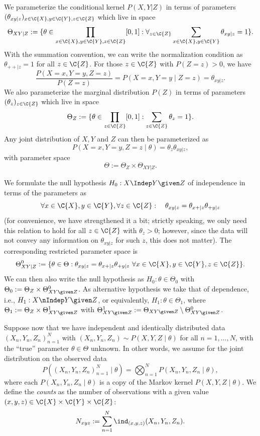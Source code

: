 We parameterize the conditional kernel $P(X,Y | Z)$ in terms of parameters
$(\theta_{xy|z})_{x\in\C{X},y\in\C{Y},z\in\C{Z}}$ which live in space
$$\Theta_{XY|Z} := %
\{ \theta \in \prod_{x\in\C{X},y\in\C{Y},z\in\C{Z}} [0,1] : \forall_{z\in\C{Z}} \sum_{x\in\C{X},y\in\C{Y}} \theta_{xy|z} = 1\}.$$
With the summation convention, we can write the normalization condition as $\theta_{++|z} = 1$ for all $z \in \C{Z}$.
For those $z\in\C{Z}$ with $P(Z = z) > 0$, we have 
$$\frac{P(X = x, Y = y, Z = z)}{P(Z=z)} = P(X = x, Y = y \mid Z=z) = \theta_{xy|z}.$$
We also parameterize the marginal distribution $P(Z)$ in terms of parameters
$(\theta_z)_{z\in\C{Z}}$ which live in space
$$\Theta_Z := \{ \theta \in \prod_{z\in\C{Z}} [0,1] : \sum_{z\in\C{Z}} \theta_z = 1\}.$$
Any joint distribution of $X,Y$ and $Z$ can then be parameterized as
$$P(X=x,Y=y,Z=z \mid \theta) = \theta_z \theta_{xy|z},$$
with parameter space
$$\Theta := \Theta_Z\times \Theta_{XY|Z}.$$

We formulate the null hypothesis $H_0 : X \Indep Y \given Z$ of independence
in terms of the parameters as
$$\forall x \in \C{X}, y \in \C{Y}, \forall z \in \C{Z}: \quad \theta_{xy|z} = \theta_{x+|z} \theta_{+ y|z}$$
(for convenience, we have strengthened it a bit; strictly speaking, we only need this relation to hold
for all $z \in \C{Z}$ with $\theta_z > 0$; however, since the data will not convey any information on $\theta_{xy|z}$
for such $z$, this does not matter).
The corresponding restricted parameter space is
$$\Theta_{XY|Z}^0 := \{\theta \in \Theta : \theta_{xy|z} = \theta_{x+|z} \theta_{+ y|z}\ \forall x \in \C{X}, y \in \C{Y}, z \in \C{Z}\}.$$
We can then also write the null hypothesis as $H_0 : \theta \in \Theta_0$ with
$\Theta_0 := \Theta_Z \times \Theta_{XY\given Z}^0$.
As alternative hypothesis we take that of dependence, i.e., $H_1 : X \nIndep Y \given Z$, or equivalently,
$H_1 : \theta \in \Theta_1$, where
$\Theta_1 := \Theta_Z \times \Theta_{XY\given Z}^1$ 
with $\Theta_{XY\given Z}^1 := \Theta_{XY\given Z} \setminus \Theta_{XY\given Z}^0$.

Suppose now that we have independent and identically distributed data $(X_n,Y_n,Z_n)_{n=1}^N$ with
$(X_n,Y_n,Z_n) \sim P(X,Y,Z \mid \theta)$ for all $n=1,\dots,N$, with the ``true'' parameter $\theta \in \Theta$
unknown.
In other words, we assume for the joint distribution on the observed data
$$P((X_n,Y_n,Z_n)_{n=1}^N \mid \theta) = \bigotimes_{n=1}^N P(X_n,Y_n,Z_n \mid \theta),$$
where each $P(X_n,Y_n,Z_n \mid \theta)$ is a copy of the Markov kernel $P(X,Y,Z \mid \theta)$.
We define the \emph{counts} as the number of observations with a given value $(x,y,z)\in\C{X}\times\C{Y}\times\C{Z}$:
$$N_{xyz} := \sum_{n=1}^N \ind_{(x,y,z)}(X_n,Y_n,Z_n).$$

